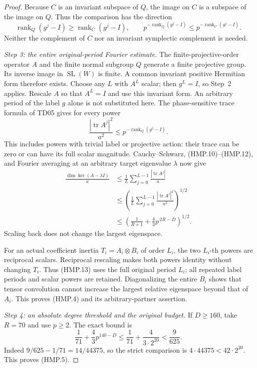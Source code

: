 \begin{proof}
Because $C$ is an invariant subspace of $Q$, the image on $C$
is a subspace of the image on $Q$.  Thus the comparison has
the direction
\[
 \operatorname{rank}_Q(g^j-I)\ge\operatorname{rank}_C(g^j-I),
 \qquad
 p^{-\operatorname{rank}_Q(g^j-I)}
           \le p^{-\operatorname{rank}_C(g^j-I)}.
 \tag{HMP.11}
\]
Neither the complement of $C$ nor an invariant symplectic
complement is needed.

\emph{Step 3: the entire original-period Fourier estimate.}
The finite-projective-order operator $A$ and the finite normal
subgroup $Q$ generate a finite projective group.  Its inverse image
in $\operatorname{SL}(W)$ is finite.  A common invariant positive
Hermitian form therefore exists.
Choose any $L$ with $A^L$ scalar; then $g^L=I$, so Step~2 applies.
Rescale $A$ so that $A^L=I$ and use this invariant form.
An arbitrary period of the label $g$ alone is not substituted here.
The phase-sensitive trace formula of TD05 gives for every power
\[
       \frac{|\operatorname{tr}A^j|^2}{a^2}
                \le p^{-\operatorname{rank}_Q(g^j-I)} .
 \tag{HMP.12}
\]
This includes powers with trivial label or projective action:
their trace can be zero or can have its full scalar magnitude.
Cauchy--Schwarz, (HMP.10)--(HMP.12), and Fourier averaging at an
arbitrary target eigenvalue $\lambda$ now give
\[
 \begin{split}
 \frac{\dim\ker(A-\lambda I)}a
 &\le \frac1L\sum_{j=0}^{L-1}\frac{|\operatorname{tr}A^j|}{a}\\
 &\le\left(\frac1L\sum_{j=0}^{L-1}
                    \frac{|\operatorname{tr}A^j|^2}{a^2}\right)^{1/2}\\
 &\le\left(\frac1{R+1}+\frac43p^{\,2R-D}\right)^{1/2}.
 \end{split}
 \tag{HMP.13}
\]
Scaling back does not change the largest eigenspace.

For an actual coefficient inertia $T_i=A_i\otimes B_i$ of order
$L_i$, the two $L_i$-th powers are reciprocal scalars.
Reciprocal rescaling makes both powers identity without changing
$T_i$.  Thus (HMP.13) uses the full original period $L_i$;
all repeated label periods and scalar powers are retained.
Diagonalizing the entire $B_i$ shows that tensor convolution
cannot increase the largest relative eigenspace beyond that of
$A_i$.  This proves (HMP.4) and its arbitrary-partner assertion.

\emph{Step 4: an absolute degree threshold and the original budget.}
If $D\ge160$, take $R=70$ and use $p\ge2$.  The exact bound is
\[
 \frac1{71}+\frac43p^{140-D}
   \le\frac1{71}+\frac4{3\cdot2^{20}}
   <\frac9{625}.
 \tag{HMP.14}
\]
Indeed $9/625-1/71=14/44375$, so the strict comparison is
$4\cdot44375<42\cdot2^{20}$.
This proves (HMP.5).


\end{proof}
